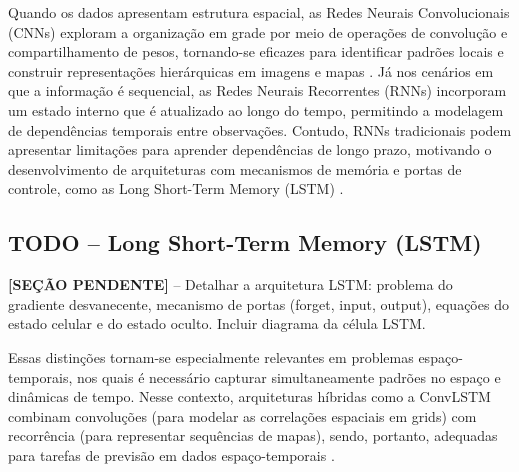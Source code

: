 Quando os dados apresentam estrutura espacial, as Redes Neurais Convolucionais (CNNs) exploram a organização em grade por meio de operações de convolução e compartilhamento de pesos, tornando-se eficazes para identificar padrões locais e construir representações hierárquicas em imagens e mapas \cite{lecun2015}. Já nos cenários em que a informação é sequencial, as Redes Neurais Recorrentes (RNNs) incorporam um estado interno que é atualizado ao longo do tempo, permitindo a modelagem de dependências temporais entre observações. 
Contudo, RNNs tradicionais podem apresentar limitações para aprender dependências de longo prazo, motivando o desenvolvimento de arquiteturas com mecanismos de memória e portas de controle, como as Long Short-Term Memory (LSTM) \cite{lipton2015}.

\subsection{TODO -- Long Short-Term Memory (LSTM)}
\label{Sec:todo_lstm}

%
%
%
%
%

\textbf{[SEÇÃO PENDENTE]} -- Detalhar a arquitetura LSTM: problema do gradiente desvanecente, mecanismo de portas (forget, input, output), equações do estado celular e do estado oculto. Incluir diagrama da célula LSTM.


Essas distinções tornam-se especialmente relevantes em problemas espaço-temporais, nos quais é necessário capturar simultaneamente padrões no espaço e dinâmicas de tempo. Nesse contexto, arquiteturas híbridas como a ConvLSTM combinam convoluções (para modelar as correlações espaciais em grids) com recorrência (para representar sequências de mapas), sendo, portanto, adequadas para tarefas de previsão em dados espaço-temporais \cite{shi2015}.


